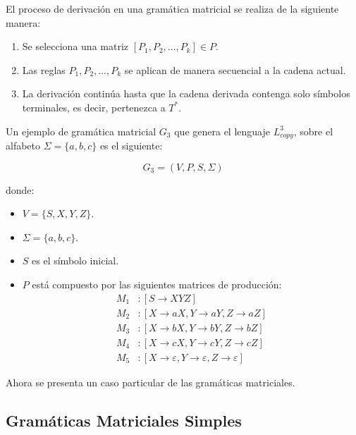 El proceso de derivación en una gramática matricial se realiza de la siguiente manera:
\begin{enumerate}
      \item Se selecciona una matriz \( [P_1, P_2, \dots, P_k] \in P \).
      \item Las reglas \( P_1, P_2, \dots, P_k \) se aplican de manera secuencial a la cadena actual.
      \item La derivación continúa hasta que la cadena derivada contenga solo símbolos terminales, es decir, pertenezca a \( T^* \).
\end{enumerate}

Un ejemplo de gramática matricial \( G_3 \) que genera el lenguaje \( L_{copy}^3\), sobre el alfabeto $\Sigma=\{a,b,c\}$ es el siguiente:

\[
      G_3 = (V, P, S, \Sigma)
\]

donde:
\begin{itemize}
      \item \( V = \{ S, X, Y, Z \} \).
      \item \( \Sigma = \{ a, b, c \} \).
      \item \( S \) es el símbolo inicial.
      \item \( P \) está compuesto por las siguientes matrices de producción:
            \[
                  \begin{aligned}
                        M_1 & : [S \to XYZ]                                               \\
                        M_2 & : [X \to aX, Y \to aY, Z \to aZ]                            \\
                        M_3 & : [X \to bX, Y \to bY, Z \to bZ]                            \\
                        M_4 & : [X \to cX, Y \to cY, Z \to cZ]                            \\
                        M_5 & : [X \to \varepsilon, Y \to \varepsilon, Z \to \varepsilon]
                  \end{aligned}
            \]
\end{itemize}

Ahora se presenta un caso particular de las gramáticas matriciales.

\subsection{Gramáticas Matriciales Simples}

